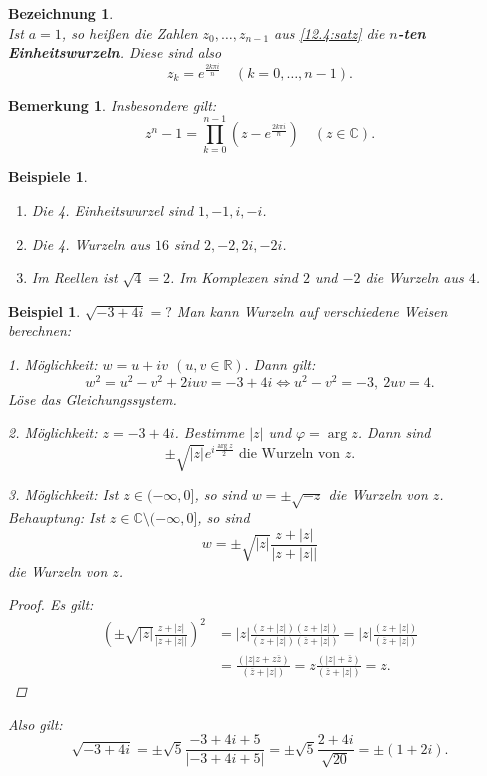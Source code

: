 \documentclass[12pt]{extreport} %
\newcommand{\C}{\mathbb{C}}
\newcommand{\R}{\mathbb{R}}
\theoremstyle{named}
\theoremstyle{itshape}
\theoremstyle{normal}
\newtheorem*{beispiel*}{Beispiel}
\newtheorem*{beispiele}{Beispiele}
\newtheorem*{bemerkung}{Bemerkung}
\newtheorem*{bezeichnung}{Bezeichnung}
\begin{document}
{
\begin{bezeichnung} ~\\
	Ist $a = 1$, so hei{\ss}en die Zahlen $z_{0}, \dotsc, z_{n-1}$ aus \ref{12.4:satz} die \textbf{$n$-ten Einheitswurzeln}.	Diese sind also 
	$$z_{k} = e^{\frac{2 k \pi i}{n}} \quad (k = 0, \dotsc, n-1).$$
\end{bezeichnung}


\begin{bemerkung}
	Insbesondere gilt:
	$$
	z^{n} - 1 = \prod_{k=0}^{n-1} (z -e^{\frac{2 k \pi i}{n}}) \quad (z \in \C).
	$$	
\end{bemerkung}


\begin{beispiele} ~\
	\begin{enumerate}
	        \item Die 4. Einheitswurzel sind $1, -1, i, -i$.
	        \item Die 4. Wurzeln aus $16$ sind $2, -2, 2i, -2i$.
		\item Im Reellen ist $\sqrt{4} = 2$. Im Komplexen sind $2$ und $-2$ die Wurzeln aus $4$.
	\end{enumerate}	
\end{beispiele}


\begin{beispiel*}
        $\sqrt{-3 + 4i}=?$ Man kann Wurzeln auf verschiedene Weisen berechnen:
	\begin{description}
		\item 1. Möglichkeit: $w = u + iv$ $(u,v \in \R).$ Dann gilt: 
			$$w^{2} = u^{2} - v^{2} + 2iuv = -3 + 4i \iff u^{2} - v^{2} = -3, ~ 2uv = 4. $$
			Löse das Gleichungssystem.
		\item 2. Möglichkeit: $z = -3 + 4i$. Bestimme $|z|$ und $\varphi = \arg z$. Dann sind
			$$ \pm \sqrt{|z|} e^{i \frac{\arg z}{2}} \text{ die Wurzeln von } z. $$
		\item 3. Möglichkeit: Ist $z \in (-\infty, 0]$, so sind $w = \pm \sqrt{-z}$ die Wurzeln von $z$. \\
		        Behauptung: Ist $z \in \C \setminus (-\infty, 0]$, so sind
			$$ w = \pm \sqrt{|z|} \frac{z + |z|}{\left| z + |z| \right|} $$
			die Wurzeln von $z$.
			\begin{proof}
				Es gilt:
				\begin{align*}
					 \left( \pm \sqrt{|z|} \frac{z + |z|}{\left| z + |z| \right|} \right)^{2} & = |z| \frac{(z + |z|) (z + |z|)}{(z + |z|) (\overline{z} + |z|)} 
					 =  |z| \frac{(z + |z|)}{(\overline{z} + |z|)} \\
					 & = \frac{(|z|z + z \overline{z})}{(\overline{z} + |z|)} = z \frac{(|z| + \overline{z})}{(\overline{z} + |z|)} = z. 
				\end{align*}
			\end{proof}
			Also gilt: 
			$$\sqrt{-3 + 4i} = \pm \sqrt{5} \frac{-3 + 4i + 5}{|-3 + 4i + 5|} = \pm \sqrt{5} \frac{2 + 4i}{\sqrt{20}} = \pm (1 + 2i).$$
	\end{description}
\end{beispiel*}


}
\end{document}
